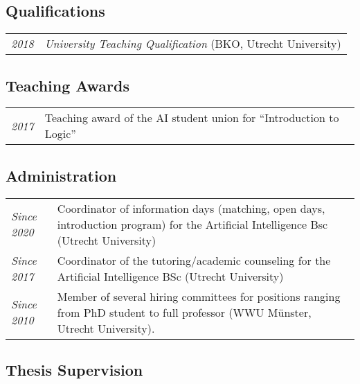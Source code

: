 \subsection*{Qualifications}

\begin{tabular}{l p{\linewidth}}
  \emph{2018} & \emph{University Teaching Qualification} (BKO, Utrecht University)
\end{tabular}

\subsection*{Teaching Awards}

\begin{tabular}{p{.1\linewidth} l}
  \emph{2017} & Teaching award of the AI student union for ``Introduction to Logic''
\end{tabular}

\subsection*{Administration}
	
\begin{tabular}{p{.15\linewidth} p{.8\linewidth}}
  \emph{Since 2020} & Coordinator of information days (matching, open days, introduction program) for the Artificial Intelligence Bsc (Utrecht University)\\
  \emph{Since 2017} & Coordinator of the tutoring/academic counseling for the Artificial Intelligence BSc (Utrecht University)\\
  \emph{Since 2010} & Member of several hiring committees for positions ranging from PhD student to full professor (WWU M\"unster, Utrecht University).
\end{tabular}

\subsection*{Thesis Supervision}

